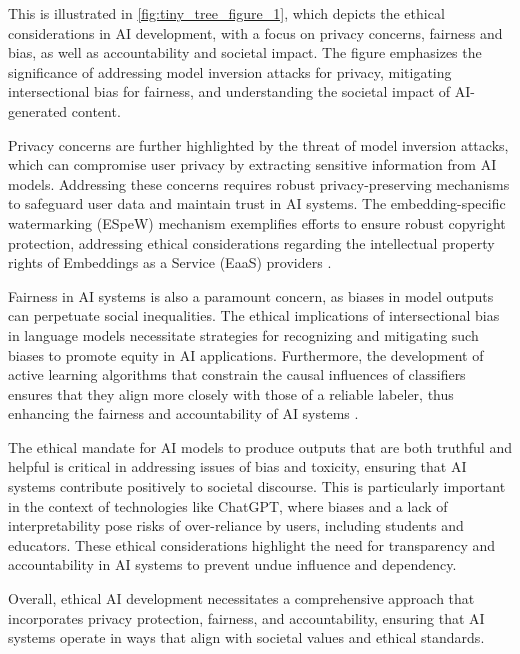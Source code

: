This is illustrated in \autoref{fig:tiny_tree_figure_1}, which depicts the ethical considerations in AI development, with a focus on privacy concerns, fairness and bias, as well as accountability and societal impact. The figure emphasizes the significance of addressing model inversion attacks for privacy, mitigating intersectional bias for fairness, and understanding the societal impact of AI-generated content.

Privacy concerns are further highlighted by the threat of model inversion attacks, which can compromise user privacy by extracting sensitive information from AI models. Addressing these concerns requires robust privacy-preserving mechanisms to safeguard user data and maintain trust in AI systems. The embedding-specific watermarking (ESpeW) mechanism exemplifies efforts to ensure robust copyright protection, addressing ethical considerations regarding the intellectual property rights of Embeddings as a Service (EaaS) providers \cite{wang2024espewrobustcopyrightprotection}.

Fairness in AI systems is also a paramount concern, as biases in model outputs can perpetuate social inequalities. The ethical implications of intersectional bias in language models necessitate strategies for recognizing and mitigating such biases to promote equity in AI applications. Furthermore, the development of active learning algorithms that constrain the causal influences of classifiers ensures that they align more closely with those of a reliable labeler, thus enhancing the fairness and accountability of AI systems \cite{sen2018supervisingfeatureinfluence}.

The ethical mandate for AI models to produce outputs that are both truthful and helpful is critical in addressing issues of bias and toxicity, ensuring that AI systems contribute positively to societal discourse. This is particularly important in the context of technologies like ChatGPT, where biases and a lack of interpretability pose risks of over-reliance by users, including students and educators. These ethical considerations highlight the need for transparency and accountability in AI systems to prevent undue influence and dependency.

Overall, ethical AI development necessitates a comprehensive approach that incorporates privacy protection, fairness, and accountability, ensuring that AI systems operate in ways that align with societal values and ethical standards.









